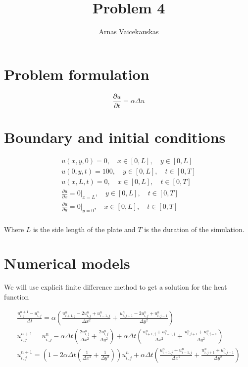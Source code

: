 \documentclass{article}
\title{Problem 4}
\author{Arnas Vaicekauskas}
\begin{document}
\maketitle

\section{Problem formulation}

$$
\frac{\partial u}{\partial t}=\alpha\Delta u
$$

\section{Boundary and initial conditions}

\begin{equation}
    \begin{aligned}
        u(x, y, 0) = 0,\quad x\in[0,L],\quad y\in[0,L]\\
        u(0, y, t) = 100,\quad y\in[0,L],\quad t\in[0,T] \\
        u(x, L, t) = 0,\quad x\in[0,L],\quad t\in[0,T]\\
        \frac{\partial u}{\partial x}=0\Big|_{x=L},\quad y\in[0,L],\quad t\in[0,T]\\
        \frac{\partial u}{\partial y}=0\Big|_{y=0},\quad x\in[0,L],\quad t\in[0,T]\\
    \end{aligned}
\end{equation}

Where $L$ is the side length of the plate and $T$ is the duration of the simulation.

\section{Numerical models}

We will use explicit finite difference method to get a solution for the heat function

\begin{equation}
    \begin{aligned}
        \frac{u^{n+1}_{i,j}-u^{n}_{i,j}}{\Delta t}=\alpha\left(\frac{u^n_{i+1,j}-2u^n_{i,j}+u^n_{i-1,j}}{\Delta x^2}+\frac{u^n_{i,j+1}-2u^n_{i,j}+u^n_{i,j-1}}{\Delta y^2}\right)\\
        u^{n+1}_{i,j}=u^{n}_{i,j}-\alpha\Delta t\left(\frac{2u^n_{i,j}}{\Delta x^2}+\frac{2u^n_{i,j}}{\Delta y^2}\right)+\alpha\Delta t\left(\frac{u^n_{i+1,j}+u^n_{i-1,j}}{\Delta x^2}+\frac{u^n_{i,j+1}+u^n_{i,j-1}}{\Delta y^2}\right)\\
        u^{n+1}_{i,j}=\left(1-2\alpha\Delta t\left(\frac{1}{\Delta x^2}+\frac{1}{\Delta y^2}\right)\right)u^{n}_{i,j}+\alpha\Delta t\left(\frac{u^n_{i+1,j}+u^n_{i-1,j}}{\Delta x^2}+\frac{u^n_{i,j+1}+u^n_{i,j-1}}{\Delta y^2}\right)
    \end{aligned}
\end{equation}
\end{document}
